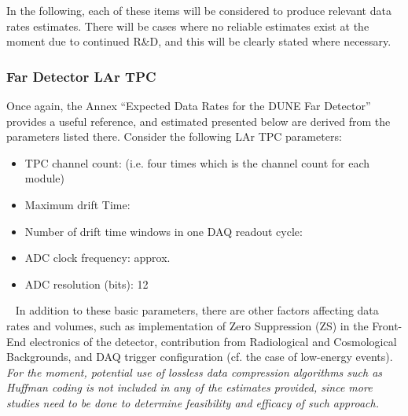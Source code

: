 In the following, each of these items will be considered to produce relevant data rates estimates.
There will be cases where no reliable estimates exist at the moment due to continued R\&D, and this will
be clearly stated where necessary.

\subsubsection{Far Detector LAr TPC}
Once again, the Annex ``Expected Data Rates for the DUNE Far Detector''
provides a useful reference, and estimated presented below are derived from
the parameters listed there. Consider the following LAr TPC parameters:
\begin{itemize}
\item TPC channel count: \dunenumberchannels (i.e. four times
  \daqchannelsperdetector which is the channel count for each \tpcdetectormass module)
\item Maximum drift Time: \tpcdrifttime
\item Number of drift time windows in one DAQ readout cycle: \daqdriftsperreadout
\item ADC clock frequency: approx. \daqsamplerate
\item ADC resolution (bits): 12
\end{itemize}
\
In addition to these basic parameters, there are other factors affecting data rates and volumes, such as
implementation of Zero Suppression (ZS)  in the Front-End electronics of the detector, contribution from
Radiological and Cosmological Backgrounds, and DAQ trigger configuration (cf. the case of low-energy events).
\textit{For the moment, potential use of lossless data compression algorithms such as Huffman coding is not
included in any of the estimates provided, since more studies need to be done to determine feasibility and efficacy
of such approach.}

